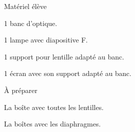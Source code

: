 
\begin{boiteMateriel}{Matériel élève}
  \effectifSeconde

  \begin{protocole}
    \item 1 banc d'optique.
    \item 1 lampe avec diapositive F.
    \item 1 support pour lentille adapté au banc.
    \item 1 écran avec son support adapté au banc.
  \end{protocole}
\end{boiteMateriel}


\begin{boiteMateriel}{À préparer}
  \begin{protocole}
    \item La boîte avec toutes les lentilles.
    \item La boîtes avec les diaphragmes.
  \end{protocole}
\end{boiteMateriel}